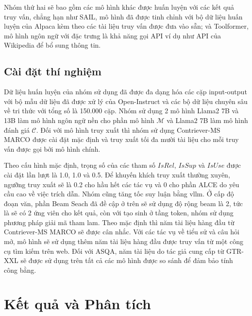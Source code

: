 \documentclass{article}
\begin{document}
Nhóm thứ hai sẽ bao gồm các mô hình khác được huấn luyện với các kết quả truy vấn, chẳng hạn như SAIL, mô hình đã được tinh chỉnh với bộ dữ liệu huấn luyện của Alpaca kèm theo các tài liệu truy vấn được đưa vào sẵn; và Toolformer, mô hình ngôn ngữ với đặc trưng là khả năng gọi API ví dụ như  API của Wikipedia để bổ sung thông tin.

\subsection{Cài đặt thí nghiệm}
Dữ liệu huấn luyện của nhóm sử dụng đã được đa dạng hóa các cặp input-output với bộ mẫu dữ liệu đã được xử lý của Open-Instruct và các bộ dữ liệu chuyên sâu về tri thức với tổng số là 150.000 cặp. Nhóm sử dụng 2 mô hình Llama2 7B và 13B làm mô hình ngôn ngữ nền cho phần mô hình $\mathcal{M}$ và Llama2 7B làm mô hình đánh giá $\mathcal{C}$. Đối với mô hình truy xuất thì nhóm sử dụng Contriever-MS MARCO được cài đặt mặc định và truy xuất tối đa mười tài liệu cho mỗi truy vấn được gọi bởi mô hình chính. 

Theo cấu hình mặc định, trọng số của các tham số $IsRel$, $IsSup$ và $IsUse$ được cài đặt lần lượt là 1.0, 1.0 và 0.5. Để khuyến khích truy xuất thường xuyên, ngưỡng truy xuất sẽ là 0.2 cho hầu hết các tác vụ và 0 cho phần ALCE do yêu cầu cao về việc trích dẫn. Nhóm cũng tăng tốc suy luận bằng vllm. Ở cấp độ đoạn văn, phần Beam Seach đã đề cập ở trên sẽ sử dụng độ rộng beam là 2, tức là sẽ có 2 ứng viên cho kết quả, còn với tạo sinh ở tầng token, nhóm sử dụng phương pháp giải mã tham lam. Theo mặc định thì năm tài liệu hàng đầu từ Contriever-MS MARCO sẽ được cân nhắc. Với các tác vụ về tiểu sử và câu hỏi mở, mô hình sẽ sử dụng thêm năm tài liệu hàng đầu được truy vấn từ một công cụ tìm kiếm trên web. Đối với ASQA, năm tài liệu do tác giả cung cấp từ  GTR-XXL sẽ được sử dụng trên tất cả các mô hình được so sánh để đảm bảo tính công bằng.
\section{Kết quả và Phân tích} \label{sec:ketqua}
\end{document}
